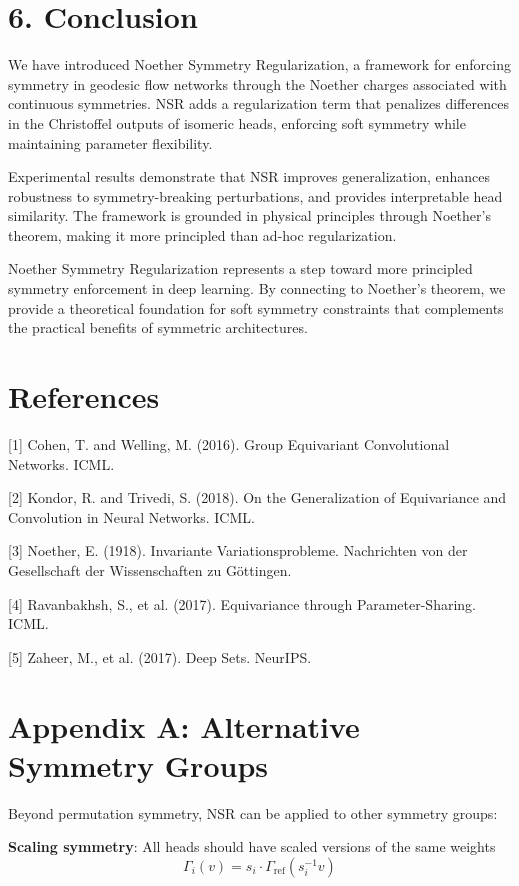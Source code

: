 \documentclass[12pt]{article}
\begin{document}
\section{6. Conclusion}

We have introduced Noether Symmetry Regularization, a framework for enforcing symmetry in geodesic flow networks through the Noether charges associated with continuous symmetries. NSR adds a regularization term that penalizes differences in the Christoffel outputs of isomeric heads, enforcing soft symmetry while maintaining parameter flexibility.

Experimental results demonstrate that NSR improves generalization, enhances robustness to symmetry-breaking perturbations, and provides interpretable head similarity. The framework is grounded in physical principles through Noether's theorem, making it more principled than ad-hoc regularization.

Noether Symmetry Regularization represents a step toward more principled symmetry enforcement in deep learning. By connecting to Noether's theorem, we provide a theoretical foundation for soft symmetry constraints that complements the practical benefits of symmetric architectures.

\section*{References}

[1] Cohen, T. and Welling, M. (2016). Group Equivariant Convolutional Networks. ICML.

[2] Kondor, R. and Trivedi, S. (2018). On the Generalization of Equivariance and Convolution in Neural Networks. ICML.

[3] Noether, E. (1918). Invariante Variationsprobleme. Nachrichten von der Gesellschaft der Wissenschaften zu Göttingen.

[4] Ravanbakhsh, S., et al. (2017). Equivariance through Parameter-Sharing. ICML.

[5] Zaheer, M., et al. (2017). Deep Sets. NeurIPS.

\appendix

\section*{Appendix A: Alternative Symmetry Groups}

Beyond permutation symmetry, NSR can be applied to other symmetry groups:

\textbf{Scaling symmetry}: All heads should have scaled versions of the same weights
\begin{equation}
\Gamma_i(v) = s_i \cdot \Gamma_{\text{ref}}(s_i^{-1} v)
\end{equation}
\end{document}
